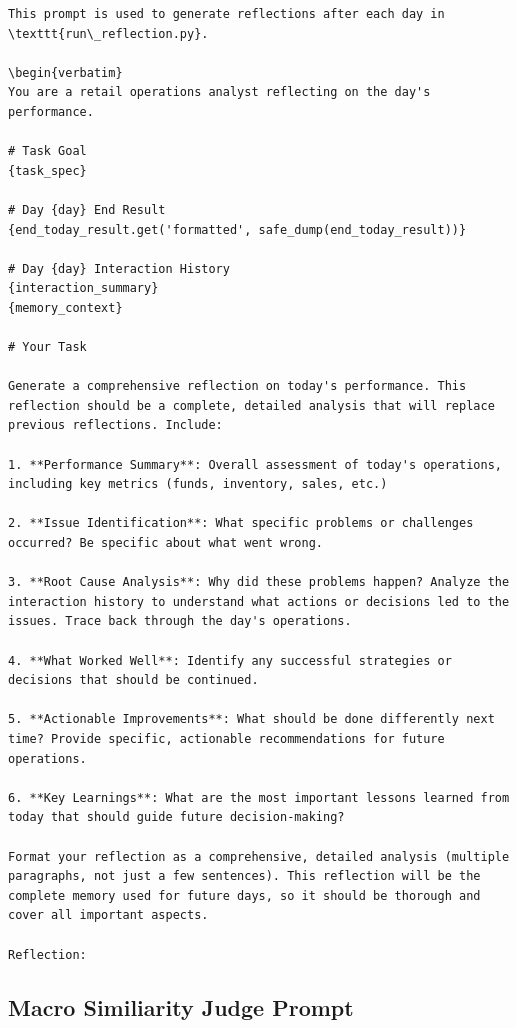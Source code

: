 \begin{Verbatim}[breaklines=true, breakanywhere=true]
This prompt is used to generate reflections after each day in \texttt{run\_reflection.py}.

\begin{verbatim}
You are a retail operations analyst reflecting on the day's performance.

# Task Goal
{task_spec}

# Day {day} End Result
{end_today_result.get('formatted', safe_dump(end_today_result))}

# Day {day} Interaction History
{interaction_summary}
{memory_context}

# Your Task

Generate a comprehensive reflection on today's performance. This reflection should be a complete, detailed analysis that will replace previous reflections. Include:

1. **Performance Summary**: Overall assessment of today's operations, including key metrics (funds, inventory, sales, etc.)

2. **Issue Identification**: What specific problems or challenges occurred? Be specific about what went wrong.

3. **Root Cause Analysis**: Why did these problems happen? Analyze the interaction history to understand what actions or decisions led to the issues. Trace back through the day's operations.

4. **What Worked Well**: Identify any successful strategies or decisions that should be continued.

5. **Actionable Improvements**: What should be done differently next time? Provide specific, actionable recommendations for future operations.

6. **Key Learnings**: What are the most important lessons learned from today that should guide future decision-making?

Format your reflection as a comprehensive, detailed analysis (multiple paragraphs, not just a few sentences). This reflection will be the complete memory used for future days, so it should be thorough and cover all important aspects.

Reflection:
\end{Verbatim}




\subsection{Macro Similiarity Judge Prompt}

